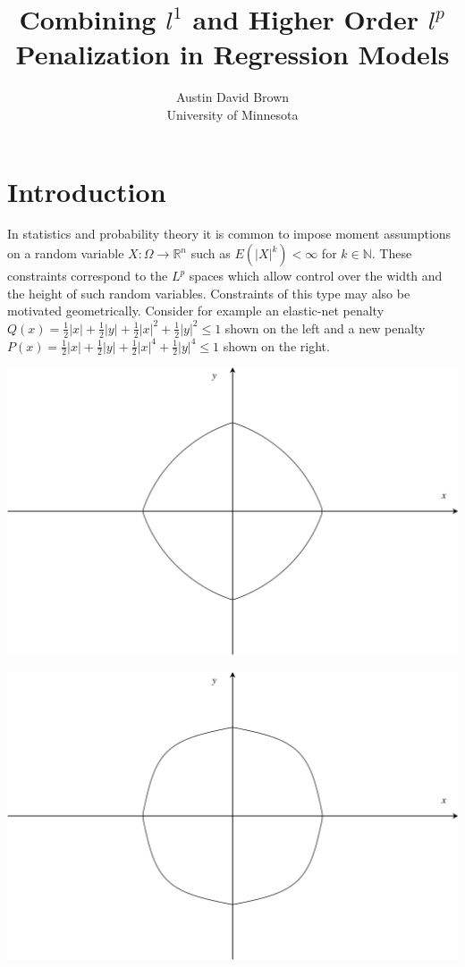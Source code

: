 \documentclass[article]{jss}
\author{Austin David Brown\\University of Minnesota}
\title{Combining $l^1$ and Higher Order $l^p$ Penalization in Regression Models}
\numberwithin{equation}{section}
\newcommand{\R}{\mathbb{R}}
\newcommand{\N}{\mathbb{N}}
\begin{document}
\section{Introduction}

In statistics and probability theory it is common to impose moment assumptions on a random variable $X : \Omega \to \R^n$ such as $E(|X|^k) < \infty$ for $k \in \N$.
These constraints correspond to the $L^p$ spaces which allow control over the width and the height of such random variables.
Constraints of this type may also be motivated geometrically.
Consider for example an elastic-net penalty $Q(x) = \frac{1}{2} |x| + \frac{1}{2} |y| + \frac{1}{2} |x|^2 + \frac{1}{2} |y|^2 \le 1$
shown on the left and a new penalty $P(x) = \frac{1}{2} |x| + \frac{1}{2} |y| + \frac{1}{2} |x|^4 + \frac{1}{2} |y|^4 \le 1$ shown on the right.

\begin{minipage}{.5\textwidth}
  \centering
  \includegraphics[width=.8\linewidth]{elasticnet.png}
\end{minipage}%
\begin{minipage}{.5\textwidth}
  \centering
  \includegraphics[width=.8\linewidth]{new_penalty_4_moment.png}
\end{minipage}
\end{document}
